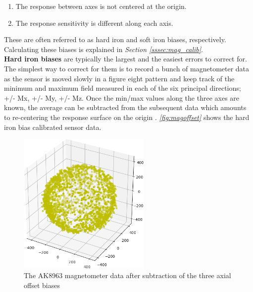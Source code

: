 \documentclass[a4paper,12pt,oneside]{book}
\begin{document}
\begin{enumerate}
\item The response between axes is not centered at the origin.
\item The response sensitivity is different along each axis. 
\end{enumerate}

These are often referred to as hard iron and soft iron biases, respectively. Calculating these biases is explained in \textit{Section \ref{sssec:mag_calib}}. \\

\textbf{Hard iron biases} are typically the largest and the easiest errors to correct for. The simplest way to correct for them is to record a bunch of magnetometer data as the sensor is moved slowly in a figure eight pattern and keep track of the minimum and maximum field measured in each of the six principal directions; +/- Mx, +/- My, +/- Mz. Once the min/max values along the three axes are known, the average can be subtracted from the subsequent data which amounts to re-centering the response surface on the origin \cite{kris}. \textit{\autoref{fig:magoffset}} shows the hard iron bias calibrated sensor data.\\

\begin{figure}[!htb]
\centering
\includegraphics[width=0.57\textwidth]{images/offset}
\caption{The AK8963 magnetometer data after subtraction of the three axial offset biases}
\label{fig:magoffset}
\end{figure}
\end{document}
